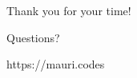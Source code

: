 \documentclass{beamer}
\begin{document}
\begin{frame}
    \begin{center}
        \huge Thank you for your time!
    \end{center}
    \begin{center}
        \large Questions?
    \end{center}
    \begin{center}
        https://mauri.codes
    \end{center}
\end{frame}
\end{document}
